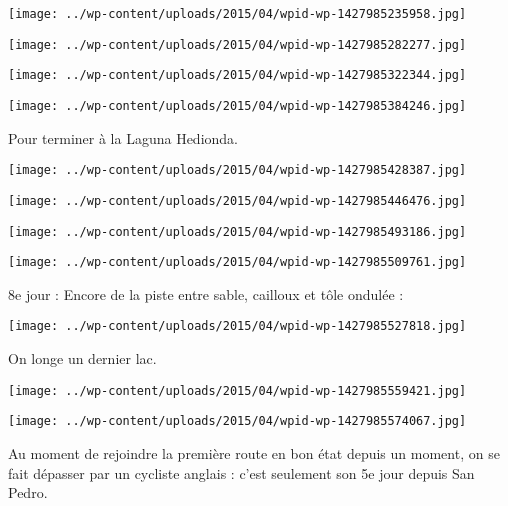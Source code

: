  \newline
\centerline{\texttt{[image: ../wp-content/uploads/2015/04/wpid-wp-1427985235958.jpg]} } 
 \newline
 \newline
\centerline{\texttt{[image: ../wp-content/uploads/2015/04/wpid-wp-1427985282277.jpg]} } 
 \newline
 \newline
\centerline{\texttt{[image: ../wp-content/uploads/2015/04/wpid-wp-1427985322344.jpg]} } 
 \newline
 \newline
\centerline{\texttt{[image: ../wp-content/uploads/2015/04/wpid-wp-1427985384246.jpg]} } 
 \newline
 Pour terminer à la Laguna Hedionda. \newline
 \newline
\centerline{\texttt{[image: ../wp-content/uploads/2015/04/wpid-wp-1427985428387.jpg]} } 
 \newline
 \newline
\centerline{\texttt{[image: ../wp-content/uploads/2015/04/wpid-wp-1427985446476.jpg]} } 
 \newline
 \newline
\centerline{\texttt{[image: ../wp-content/uploads/2015/04/wpid-wp-1427985493186.jpg]} } 
 \newline
 \newline
\centerline{\texttt{[image: ../wp-content/uploads/2015/04/wpid-wp-1427985509761.jpg]} } 
 \newline
 8e jour : \newline
 Encore de la piste entre sable, cailloux et tôle ondulée : \newline
 \newline
\centerline{\texttt{[image: ../wp-content/uploads/2015/04/wpid-wp-1427985527818.jpg]} } 
 \newline
 On longe un dernier lac. \newline
 \newline
\centerline{\texttt{[image: ../wp-content/uploads/2015/04/wpid-wp-1427985559421.jpg]} } 
 \newline
 \newline
\centerline{\texttt{[image: ../wp-content/uploads/2015/04/wpid-wp-1427985574067.jpg]} } 
 \newline
 Au moment de rejoindre la première route en bon état depuis un moment, on se fait dépasser par un cycliste anglais : c'est seulement son 5e jour depuis San Pedro. \newline
